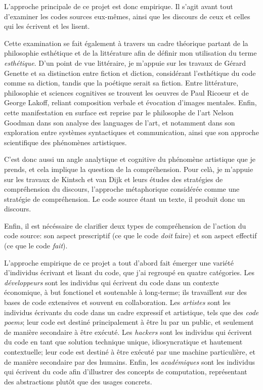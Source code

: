 \documentclass{article}
\begin{document}
L'approche principale de ce projet est donc empirique. Il s'agit avant tout d'examiner les codes sources eux-mêmes, ainsi que les discours de ceux et celles qui les écrivent et les lisent.

Cette examination se fait également à travers un cadre théorique partant de la philosophie esthétique et de la littérature afin de définir mon utilisation du terme \emph{esthétique}. D'un point de vue littéraire, je m'appuie sur les travaux de Gérard Genette et sa distinction entre fiction et diction\cite{genette_fiction_1993}, considérant l'esthétique du code comme sa diction, tandis que la poétique serait sa fiction. Entre littérature, philosophie et sciences cognitives se trouvent les oeuvres de Paul Ricoeur\cite{ricoeur_rule_2003} et de George Lakoff\cite{lakoff_metaphors_1980}, reliant composition verbale et évocation d'images mentales. Enfin, cette manifestation en surface est reprise par le philosophe de l'art Nelson Goodman dans son analyse des languages de l'art\cite{goodman_languages_1976}, et notamment dans son exploration entre systèmes syntactiques et communication, ainsi que son approche scientifique des phénomènes artistiques.

C'est donc aussi un angle analytique et cognitive du phénomène artistique que je prends, et cela implique la question de la compréhension. Pour celà, je m'appuie sur les travaux de Kintsch et van Dijk et leurs études des stratégies de compréhension du discours\cite{kintsch_toward_1978}, l'approche métaphorique considérée comme une stratégie de compréhension. Le code source étant un texte, il produit donc un discours.

Enfin, il est nécéssaire de clarifier deux types de compréhension de l'action du code source: son aspect prescriptif (ce que le code \emph{doit} faire) et son aspect effectif (ce que le code \emph{fait}).

L'approche empirique de ce projet a tout d'abord fait émerger une variété d'individus écrivant et lisant du code, que j'ai regroupé en quatre catégories\cite{hayes_cultures_2017}. Les \emph{développeurs} sont les individus qui écrivent du code dans un contexte économique, à but fonctionel et soutenable à long-terme; ils travaillent sur des bases de code extensives et souvent en collaboration. Les \emph{artistes} sont les individus écrivants du code dans un cadre expressif et artistique, tels que des \emph{code poems}; leur code est destiné principalement à être lu par un public, et seulement de manière secondaire à être exécuté. Les \emph{hackers} sont les individus qui écrivent du code en tant que solution technique unique, idiosyncratique et hautement contextuelle; leur code est destiné à être exécuté par une machine particulière, et de manière secondaire par des humains. Enfin, les \emph{académiques} sont les individus qui écrivent du code afin d'illustrer des concepts de computation, représentant des abstractions plutôt que des usages concrets.
\end{document}
